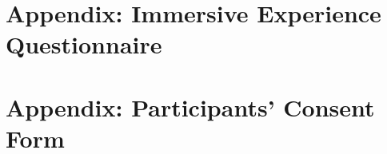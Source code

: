 \documentclass[12pt,twoside,english]{article}
\begin{document}





% 


\appendix
\section{Appendix: Immersive Experience Questionnaire}
\label{sect:appendix}
\label{sect:ieq}

\section{Appendix: Participants' Consent Form}
\label{sect:consent-form}

\clearpage
\end{document}
